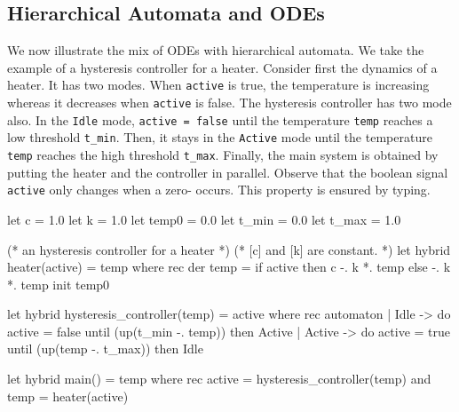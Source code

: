 \documentclass[11pt,titlepage,twoside]{report}
\newcommand{\Marc}[1]{{\bf Marc.} {#1} {\bf Fin}}
\begin{document}
\subsection{Hierarchical Automata and ODEs}
We now illustrate the mix of \acp{ODE} with hierarchical automata. We take
the example of a hysteresis controller for a heater.  Consider first
the dynamics of a heater. It has two modes. When \texttt{active} is true,
the temperature is increasing whereas it decreases when
\texttt{active} is false. The hysteresis controller has two mode also. In the
\texttt{Idle} mode, \texttt{active = false} until the temperature
\texttt{temp} reaches a low threshold \verb-t_min-. Then, it stays in
the \texttt{Active} mode until the temperature \verb-temp- reaches the
high threshold \verb-t_max-. Finally, the main system is obtained by
putting the heater and the controller in parallel. Observe that the
boolean signal \verb-active- only changes when a zero-
occurs. This property is ensured by typing.







\begin{runverbatim}
let c = 1.0
let k = 1.0
let temp0 = 0.0
let t_min = 0.0
let t_max = 1.0
\end{runverbatim}
\begin{runverbatim}[continue]
(* an hysteresis controller for a heater *)
(* [c] and [k] are constant. *)
let hybrid heater(active) = temp where
  rec der temp = if active then c -. k *. temp else -. k *. temp init temp0

let hybrid hysteresis_controller(temp) = active where
  rec automaton
      | Idle -> do active = false until (up(t_min -. temp)) then Active
      | Active -> do active = true until (up(temp -. t_max)) then Idle
 
let hybrid main() = temp where
  rec active = hysteresis_controller(temp)
  and temp = heater(active)
\end{runverbatim}
\end{document}
